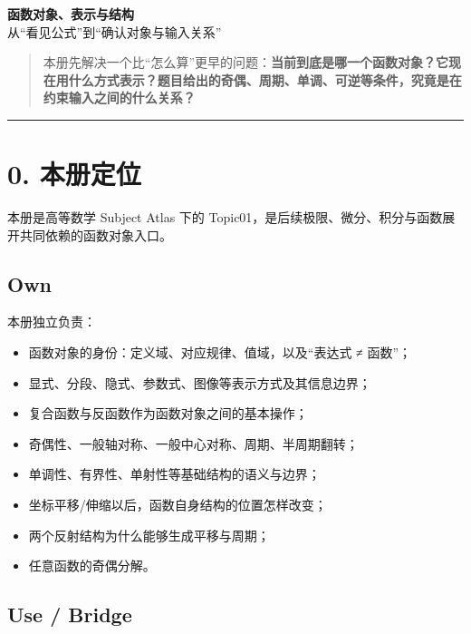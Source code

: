 \documentclass[11pt,a4paper]{ctexart}
\providecommand{\tightlist}{}
\begin{document}
\begin{center}
{\LARGE\textbf{函数对象、表示与结构}}\\[0.4em]
{\large 从“看见公式”到“确认对象与输入关系”}
\end{center}
\vspace{0.5em}

\begin{quote}
本册先解决一个比``怎么算''更早的问题：\textbf{当前到底是哪一个函数对象？它现在用什么方式表示？题目给出的奇偶、周期、单调、可逆等条件，究竟是在约束输入之间的什么关系？}
\end{quote}

\begin{center}\rule{0.5\linewidth}{0.5pt}\end{center}

\section{0. 本册定位}\label{ux672cux518cux5b9aux4f4d}

本册是高等数学 Subject Atlas 下的
Topic01，是后续极限、微分、积分与函数展开共同依赖的函数对象入口。

\subsection{Own}\label{own}

本册独立负责：

\begin{itemize}
\tightlist
\item
  函数对象的身份：定义域、对应规律、值域，以及``表达式 ≠ 函数''；
\item
  显式、分段、隐式、参数式、图像等表示方式及其信息边界；
\item
  复合函数与反函数作为函数对象之间的基本操作；
\item
  奇偶性、一般轴对称、一般中心对称、周期、半周期翻转；
\item
  单调性、有界性、单射性等基础结构的语义与边界；
\item
  坐标平移/伸缩以后，函数自身结构的位置怎样改变；
\item
  两个反射结构为什么能够生成平移与周期；
\item
  任意函数的奇偶分解。
\end{itemize}

\subsection{Use / Bridge}\label{use-bridge}
\end{document}
